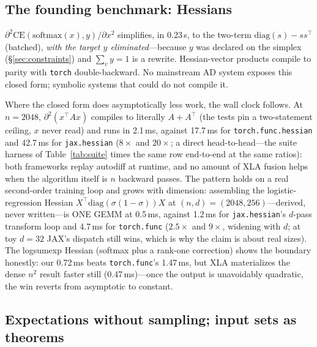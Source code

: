 \documentclass[sigplan,10pt,review]{acmart}
\begin{document}
\subsection{The founding benchmark: Hessians}\label{sec:hessian}

$\partial^2 \mathrm{CE}(\mathrm{softmax}(x), y)/\partial x^2$ simplifies,
in 0.23\,s, to the two-term
$\mathrm{diag}(s) - ss^{\top}$ (batched), \emph{with the target $y$
eliminated}---because $y$ was declared on the simplex
(\S\ref{sec:constraints}) and $\sum_v y = 1$ is a rewrite. Hessian-vector
products compile to parity with \texttt{torch} double-backward. No
mainstream AD system exposes this closed form; symbolic systems that
could do not compile it.

Where the closed form does asymptotically less work, the wall clock
follows. At $n{=}2048$, $\partial^2(x^{\top}Ax)$ compiles to literally
$A + A^{\top}$ (the tests pin a two-statement ceiling, $x$ never read)
and runs in 2.1\,ms, against 17.7\,ms for \texttt{torch.func.hessian} \cite{functorch}
and 42.7\,ms for \texttt{jax.hessian} ($8\times$ and $20\times$; a direct
head-to-head---the suite harness of Table~\ref{tab:suite} times the same
row end-to-end at the same ratios): both
frameworks replay autodiff at runtime, and no amount of XLA fusion helps
when the algorithm itself is $n$ backward passes. The pattern holds on a
real second-order training loop and grows with dimension: assembling the
logistic-regression Hessian $X^{\top}\mathrm{diag}(\sigma(1-\sigma))X$
at $(n,d)=(2048,256)$---derived, never written---is ONE GEMM at 0.5\,ms,
against 1.2\,ms for \texttt{jax.hessian}'s $d$-pass transform loop and
4.7\,ms for \texttt{torch.func} ($2.5\times$ and $9\times$, widening
with $d$; at toy $d{=}32$ JAX's dispatch still wins, which is why the
claim is about real sizes). The logsumexp Hessian
(softmax plus a rank-one correction) shows the boundary honestly: our
0.72\,ms beats \texttt{torch.func}'s 1.47\,ms, but XLA materializes the
dense $n^2$ result faster still (0.47\,ms)---once the output is
unavoidably quadratic, the win reverts from asymptotic to constant.

\subsection{Expectations without sampling; input sets as theorems}
\label{sec:vae}
\end{document}
